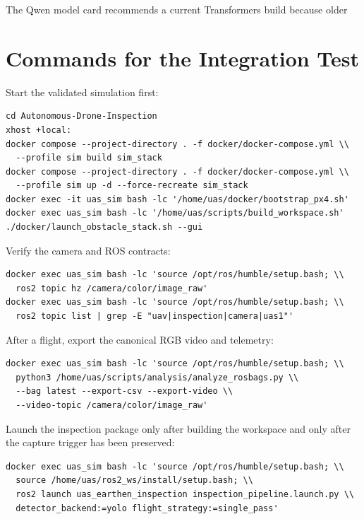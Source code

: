\documentclass[11pt,a4paper]{article}
\begin{document}
The Qwen model card recommends a current Transformers build because older

\section{Commands for the Integration Test}

Start the validated simulation first:

\begin{verbatim}
cd Autonomous-Drone-Inspection
xhost +local:
docker compose --project-directory . -f docker/docker-compose.yml \\
  --profile sim build sim_stack
docker compose --project-directory . -f docker/docker-compose.yml \\
  --profile sim up -d --force-recreate sim_stack
docker exec -it uas_sim bash -lc '/home/uas/docker/bootstrap_px4.sh'
docker exec uas_sim bash -lc '/home/uas/scripts/build_workspace.sh'
./docker/launch_obstacle_stack.sh --gui
\end{verbatim}

Verify the camera and ROS contracts:

\begin{verbatim}
docker exec uas_sim bash -lc 'source /opt/ros/humble/setup.bash; \\
  ros2 topic hz /camera/color/image_raw'
docker exec uas_sim bash -lc 'source /opt/ros/humble/setup.bash; \\
  ros2 topic list | grep -E "uav|inspection|camera|uas1"'
\end{verbatim}

After a flight, export the canonical RGB video and telemetry:

\begin{verbatim}
docker exec uas_sim bash -lc 'source /opt/ros/humble/setup.bash; \\
  python3 /home/uas/scripts/analysis/analyze_rosbags.py \\
  --bag latest --export-csv --export-video \\
  --video-topic /camera/color/image_raw'
\end{verbatim}

Launch the inspection package only after building the workspace and only after
the capture trigger has been preserved:

\begin{verbatim}
docker exec uas_sim bash -lc 'source /opt/ros/humble/setup.bash; \\
  source /home/uas/ros2_ws/install/setup.bash; \\
  ros2 launch uas_earthen_inspection inspection_pipeline.launch.py \\
  detector_backend:=yolo flight_strategy:=single_pass'
\end{verbatim}
\end{document}

